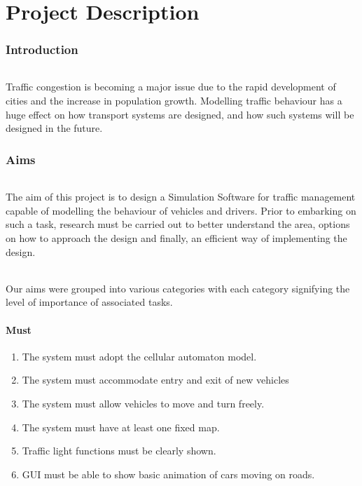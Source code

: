 \documentclass[11pt, a4paper]{article}
\begin{document}
​
\part*{Project Description}
\section{Introduction}
\paragraph{}
Traffic congestion is becoming a major issue due to the rapid development of cities and the increase in population growth. Modelling traffic behaviour has a huge effect on how  transport systems are designed, and how such systems will be designed in the future.

\section{Aims}
\paragraph{}
The aim of this project is to design a Simulation Software for traffic management capable of modelling the behaviour of vehicles and drivers.
Prior to embarking on such a task, research must be carried out to better understand the area, options on how to approach the design and finally, an efficient way of implementing the design.  
​
\paragraph{}
Our aims were grouped into various categories with each category signifying the level of importance of associated tasks. 
​
\subsection{Must} 
\begin{enumerate}[itemsep = -1ex]
\item The system must adopt the cellular automaton model.
\item The system must accommodate entry and exit of new vehicles
\item The system must allow vehicles to move and turn freely.
\item The system must have at least one fixed map.
\item Traffic light functions must be clearly shown.
\item GUI must be able to show basic animation of cars moving on roads.
\end{enumerate}
​
\end{document}
